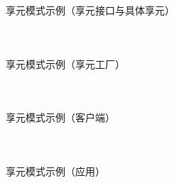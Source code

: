 \documentclass[UTF8,aspectratio=169]{beamer}
\begin{document}
\begin{frame}{享元模式示例（享元接口与具体享元）}
    \begin{columns}
        \begin{column}{0.48\textwidth}
            \inputminted[firstline=1, lastline=15]{cpp}{code/flyweight_pattern.cpp}
        \end{column}
        \begin{column}{0.48\textwidth}
            \inputminted[firstline=17, lastline=28]{cpp}{code/flyweight_pattern.cpp}
        \end{column}
    \end{columns}
\end{frame}

\begin{frame}{享元模式示例（享元工厂）}
    \begin{columns}
        \begin{column}{0.48\textwidth}
            \inputminted[firstline=30, lastline=45]{cpp}{code/flyweight_pattern.cpp}
        \end{column}
        \begin{column}{0.48\textwidth}
            \inputminted[firstline=46, lastline=60]{cpp}{code/flyweight_pattern.cpp}
        \end{column}
    \end{columns}
\end{frame}

\begin{frame}{享元模式示例（客户端）}
    \begin{columns}
        \begin{column}{0.48\textwidth}
            \inputminted[firstline=62, lastline=77]{cpp}{code/flyweight_pattern.cpp}
        \end{column}
        \begin{column}{0.48\textwidth}
            \inputminted[firstline=78, lastline=86]{cpp}{code/flyweight_pattern.cpp}
        \end{column}
    \end{columns}
\end{frame}

\begin{frame}{享元模式示例（应用）}
    \inputminted[firstline=94, lastline=112]{cpp}{code/flyweight_pattern.cpp}
\end{frame}
\end{document}
